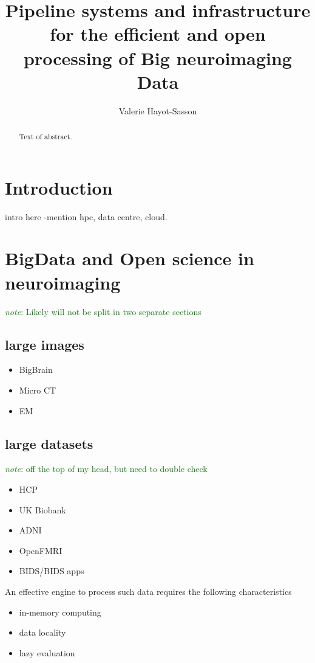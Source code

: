 \documentclass{report}
\newcommand{\note}[1]{\textcolor{green}{\textit{note}: #1}}
\begin{document}
\title{Pipeline systems and infrastructure for the efficient and open processing of Big neuroimaging Data}
\author{Valerie Hayot-Sasson}
\maketitle
\begin{abstract}
  Text of abstract.  
\end{abstract}
\tableofcontents
\chapter{Introduction}
intro here -mention hpc, data centre, cloud. 
\chapter{BigData and Open science in neuroimaging}
    \note{Likely will not be split in two separate sections}
    \section{large images}
        \begin{itemize}  
            \item BigBrain
            \item Micro CT 
            \item EM 
        \end{itemize}
    \section{large datasets}
    	\note{off the top of my head, but need to double check}
        \begin{itemize}
            \item HCP
            \item UK Biobank
            \item ADNI
            \item OpenFMRI
            \item BIDS/BIDS apps
        \end{itemize}
    An effective engine to process such data requires the following characteristics
        \begin{itemize}
            \item in-memory computing
            \item data locality
            \item lazy evaluation
        \end{itemize}
\end{document}
